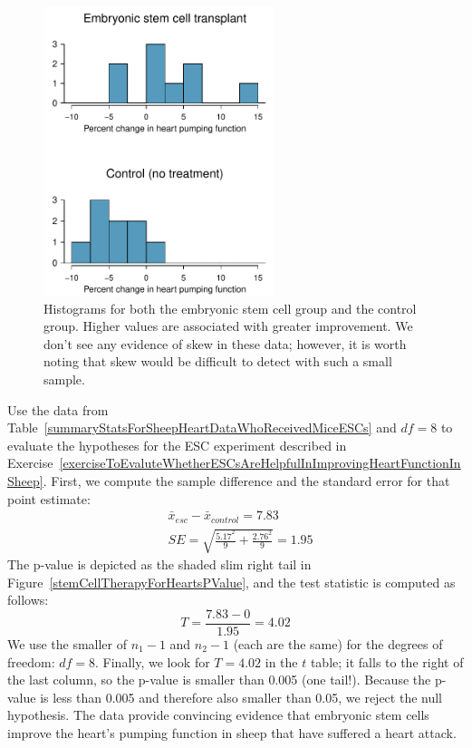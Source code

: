 \begin{figure}
\centering
\includegraphics[width=0.6\textwidth]{05/figures/stemCellTherapyForHearts/stemCellTherapyForHearts}
\caption{Histograms for both the embryonic stem cell group and the control group. Higher values are associated with greater improvement. We don't see any evidence of skew in these data; however, it is worth noting that skew would be difficult to detect with such a small sample.}
\label{stemCellTherapyForHearts}
\end{figure}

\begin{example}{Use the data from Table~\ref{summaryStatsForSheepHeartDataWhoReceivedMiceESCs} and $df=8$ to evaluate the hypotheses for the ESC experiment described in Exercise~\ref{exerciseToEvaluteWhetherESCsAreHelpfulInImprovingHeartFunctionInSheep}.}
First, we compute the sample difference and the standard error for that point estimate:
\begin{align*}
& \bar{x}_{esc} - \bar{x}_{control} = 7.83 \\
& SE = \sqrt{\frac{5.17^2}{9} + \frac{2.76^2}{9}} = 1.95
\end{align*}
The p-value is depicted as the shaded slim right tail in Figure~\ref{stemCellTherapyForHeartsPValue}, and the test statistic is computed as follows:
$$T = \frac{7.83 - 0}{1.95} = 4.02$$
We use the smaller of $n_1-1$ and $n_2-1$ (each are the same) for the degrees of freedom: $df=8$. Finally, we look for $T=4.02$ in the $t$ table; it falls to the right of the last column, so the p-value is smaller than 0.005 (one tail!). Because the p-value is less than 0.005 and therefore also smaller than 0.05, we reject the null hypothesis. The data provide convincing evidence that embryonic stem cells improve the heart's pumping function in sheep that have suffered a heart attack.
\end{example}

